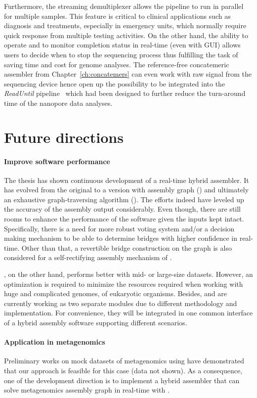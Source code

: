 Furthermore, the streaming demultiplexer \npbarcode{} allows the pipeline to run in parallel for multiple samples.
This feature is critical to clinical applications such as diagnosis and treatments, especially in emergency units, which normally require quick response from multiple testing activities.
On the other hand, the ability to operate and to monitor completion status in real-time (even with GUI) allows users to decide when to stop the sequencing process thus fulfilling the task of saving time and cost for genome analyses.
The reference-free concatemeric assembler from Chapter~\ref{ch:concatemers} can even work with raw signal from the sequencing device hence open up the possibility to be integrated into the \emph{ReadUntil} pipeline~\cite{LooseMS2016} which had been designed to further reduce the turn-around time of the nanopore data analyses.
\section{Future directions}
\paragraph{Improve software performance}
The thesis has shown continuous development of a real-time hybrid assembler. It has evolved from the original \npscarf{} to a version with assembly graph (\npscarfg{}) and ultimately an exhaustive graph-traversing algorithm (\npgraph{}). 
The efforts indeed have leveled up the accuracy of the assembly output considerably.
Even though, there are still rooms to enhance the performance of the software given the inputs kept intact.
Specifically, there is a need for more robust voting system and/or a decision making mechanism to be able to determine bridges with higher confidence in real-time.  
Other than that, a revertible bridge construction on the graph is also considered for a self-rectifying assembly mechanism of \npgraph{}. 

\npscarf{}, on the other hand, performs better with mid- or large-size datasets. However, an optimization is required to minimize the resources required when working with huge and complicated genomes, \EG{} of eukaryotic organisms.
Besides, \npscarf{} and \npgraph{} are currently working as two separate modules due to different methodology and implementation. For convenience, they will be integrated in one common interface of a hybrid assembly software supporting different scenarios.

\paragraph{Application in metagenomics}
Preliminary works on mock datasets of metagenomics using \npscarf{} have demonstrated that our approach is feasible for this case (data not shown).
As a consequence, one of the development direction is to implement a hybrid assembler that can solve metagenomics assembly graph in real-time with \npgraph{}.

